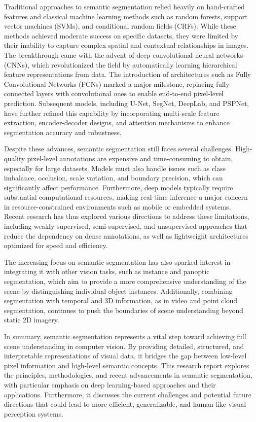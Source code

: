 Traditional approaches to semantic segmentation relied heavily on hand-crafted features and classical machine learning methods such as random forests, support vector machines (SVMs), and conditional random fields (CRFs). While these methods achieved moderate success on specific datasets, they were limited by their inability to capture complex spatial and contextual relationships in images. The breakthrough came with the advent of deep convolutional neural networks (CNNs), which revolutionized the field by automatically learning hierarchical feature representations from data. The introduction of architectures such as Fully Convolutional Networks (FCNs) marked a major milestone, replacing fully connected layers with convolutional ones to enable end-to-end pixel-level prediction. Subsequent models, including U-Net, SegNet, DeepLab, and PSPNet, have further refined this capability by incorporating multi-scale feature extraction, encoder-decoder designs, and attention mechanisms to enhance segmentation accuracy and robustness.

Despite these advances, semantic segmentation still faces several challenges. High-quality pixel-level annotations are expensive and time-consuming to obtain, especially for large datasets. Models must also handle issues such as class imbalance, occlusion, scale variation, and boundary precision, which can significantly affect performance. Furthermore, deep models typically require substantial computational resources, making real-time inference a major concern in resource-constrained environments such as mobile or embedded systems. Recent research has thus explored various directions to address these limitations, including weakly supervised, semi-supervised, and unsupervised approaches that reduce the dependency on dense annotations, as well as lightweight architectures optimized for speed and efficiency.

The increasing focus on semantic segmentation has also sparked interest in integrating it with other vision tasks, such as instance and panoptic segmentation, which aim to provide a more comprehensive understanding of the scene by distinguishing individual object instances. Additionally, combining segmentation with temporal and 3D information, as in video and point cloud segmentation, continues to push the boundaries of scene understanding beyond static 2D imagery.

In summary, semantic segmentation represents a vital step toward achieving full scene understanding in computer vision. By providing detailed, structured, and interpretable representations of visual data, it bridges the gap between low-level pixel information and high-level semantic concepts. This research report explores the principles, methodologies, and recent advancements in semantic segmentation, with particular emphasis on deep learning-based approaches and their applications. Furthermore, it discusses the current challenges and potential future directions that could lead to more efficient, generalizable, and human-like visual perception systems.


